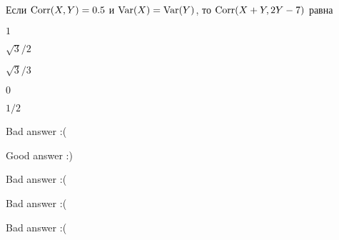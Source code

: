 
\begin{question}
Если \(\operatorname{Corr}(X, Y)= 0.5\) и \(\operatorname{Var}(X)=\operatorname{Var}(Y)\), то
\(\operatorname{Corr}(X + Y, 2Y - 7)\) равна
\begin{answerlist}
  \item \(1\)
  \item \(\sqrt{3}/2\)
  \item \(\sqrt{3}/3\)
  \item \(0\)
  \item \(1/2\)
\end{answerlist}
\end{question}

\begin{solution}
\begin{answerlist}
  \item Bad answer :(
  \item Good answer :)
  \item Bad answer :(
  \item Bad answer :(
  \item Bad answer :(
\end{answerlist}
\end{solution}

